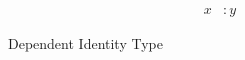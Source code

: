 \documentclass[11pt,twoside]{article}
\newcommand{\const}[1]{\text{#1}}
\newcommand{\appobj}[2]{{#1}\,{#2}}
\begin{document}
\newcommand{\idcon}{\const{id}}
\newcommand{\idof}[3]{\appobj{\appobj{\appobj{\idcon}{#1}}{#2}}{#3}}
\newcommand{\reflcon}{\const{refl}}

\begin{figure}
  
  \begin{align*}
    x & : y
  \end{align*}

  \caption{Dependent Identity Type}
  \label{fig:dep-id}
\end{figure}



\end{document}
